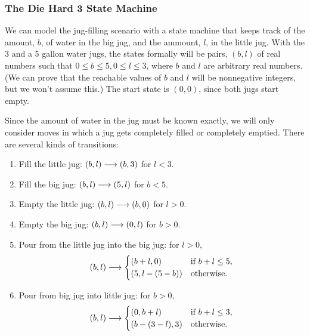 \subsubsection{The Die Hard 3 State Machine}
We can model the jug-filling scenario with a state machine that keeps
track of the amount, $b$, of water in the big jug, and the ammount,
$l$, in the little jug.  With the 3 and a 5 gallon water
jugs, the states formally will be pairs, $(b,l)$ of real numbers such
that $0 \leq b \leq 5, 0 \leq l \leq 3$, where $b$ and $l$ are
arbitrary real numbers.  (We can prove that the reachable values of
$b$ and $l$ will be nonnegative integers, but we won't assume this.)
The start state is $(0,0)$, since both jugs start empty.

Since the amount of water in the jug must be known exactly, we will only
consider moves in which a jug gets completely filled or completely
emptied.  There are several kinds of transitions:
\begin{enumerate}

\item  Fill the little jug: $(b,l) \mathrel{\longrightarrow} (b,3)$ for $l < 3$.

\item  Fill the big jug: $(b,l) \mathrel{\longrightarrow} (5,l)$ for $b<5$.

\item  Empty the little jug: $(b,l) \mathrel{\longrightarrow} (b,0)$ for $l>0$.

\item  Empty the big jug: $(b,l) \mathrel{\longrightarrow} (0,l)$ for $b>0$.

\item  Pour from the little jug into the big jug: for $l>0$,
\begin{equation*}
(b,l) \mathrel{\longrightarrow}
\begin{cases}
(b+l, 0) & \text{if $b + l \le 5$,}\\
(5, l - (5 - b)) & \text{otherwise.}
\end{cases}
\end{equation*}

\item Pour from big jug into little jug: for $b>0$,
\begin{equation*}
(b,l) \mathrel{\longrightarrow}
\begin{cases}
(0, b+l) & \text{if $b + l \le 3$,}\\
(b - (3 -l), 3) & \text{otherwise.}
\end{cases}
\end{equation*}
\end{enumerate}

